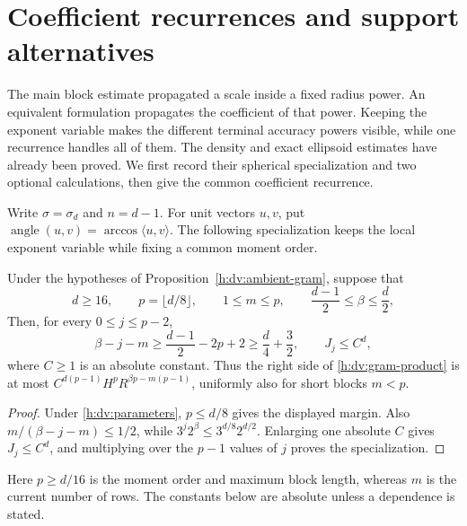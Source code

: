 \section{Coefficient recurrences and support alternatives}
\label{h:ev:section}

The main block estimate propagated a scale inside a fixed radius
power. An equivalent formulation propagates the coefficient of that
power. Keeping the exponent variable makes the different terminal
accuracy powers visible, while one recurrence handles all of them.
The density and exact ellipsoid estimates have already been proved.
We first record their spherical specialization and two optional
calculations, then give the common coefficient recurrence.

Write \(\sigma=\sigma_d\) and \(n=d-1\). For unit vectors \(u,v\),
put \(\operatorname{angle}(u,v)=\arccos\langle u,v\rangle\).
The following specialization keeps the local exponent variable while
fixing a common moment order.

\begin{corollary}
Under the hypotheses of Proposition~\ref{h:dv:ambient-gram}, suppose that
\begin{equation}
 d\ge16,\qquad p=\lfloor d/8\rfloor,\qquad
 1\le m\le p,\qquad \frac{d-1}{2}\le\beta\le\frac d2,
 \label{h:dv:parameters}
\end{equation}
Then, for every \(0\le j\le p-2\),
\begin{equation}
 \beta-j-m\ge\frac{d-1}{2}-2p+2
 \ge\frac d4+\frac32,
 \qquad J_j\le C^d,
 \label{h:dv:dimension-margin}
\end{equation}
where \(C\ge1\) is an absolute constant.  Thus the right side of
\eqref{h:dv:gram-product} is at most
\(C^{d(p-1)}H^pR^{\beta p-m(p-1)}\), uniformly also for short blocks
\(m<p\).
\end{corollary}

\begin{proof}
Under \eqref{h:dv:parameters}, \(p\le d/8\) gives the displayed
margin.  Also \(m/(\beta-j-m)\le1/2\), while
\(3^j2^\beta\le3^{d/8}2^{d/2}\).  Enlarging one absolute \(C\) gives
\(J_j\le C^d\), and multiplying over the \(p-1\) values of \(j\)
proves the specialization.
\end{proof}


Here \(p\ge d/16\) is the moment order and maximum block length,
whereas \(m\) is the current number of rows. The constants below
are absolute unless a dependence is stated.

